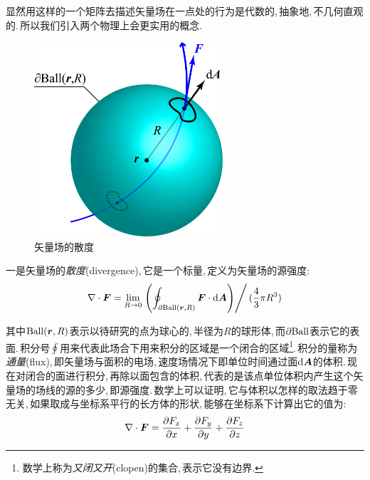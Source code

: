 显然用这样的一个矩阵去描述矢量场在一点处的行为是代数的,\,抽象地,\,不几何直观的.\,所以我们引入两个物理上会更实用的概念.

\begin{figure}
\centering
\includegraphics[width=7cm]{image/7-1-4.png}
\caption{矢量场的散度}
\end{figure}
一是矢量场的\emph{散度}(divergence),\,它是一个标量,\,定义为矢量场的源强度:
\[\nabla\cdot \boldsymbol{F}=\lim_{R\to 0}\left.\left(\oint_{\partial {\rm Ball}(\boldsymbol{r},R)}\boldsymbol{F}\cdot \textrm{d}\boldsymbol{A}\right)\right/(\frac{4}{3}\pi R^3)\]

其中\({\rm Ball}(\boldsymbol{r},R)\)表示以待研究的点为球心的,\,半径为\(R\)的球形体,\,而\(\partial {\rm Ball}\)表示它的表面.\,积分号\(\oint\)用来代表此场合下用来积分的区域是一个闭合的区域\footnote{数学上称为\emph{又闭又开}(clopen)的集合,\,表示它没有边界.}.\,积分的量称为\emph{通量}(flux),\,即矢量场与面积的电场,\,速度场情况下即单位时间通过面\(\textrm{d} \boldsymbol{A}\)的体积.\,现在对闭合的面进行积分,\,再除以面包含的体积,\,代表的是该点单位体积内产生这个矢量场的场线的源的多少,\,即源强度.\,数学上可以证明,\,它与体积以怎样的取法趋于零无关,\,如果取成与坐标系平行的长方体的形状,\,能够在坐标系下计算出它的值为:
\[\nabla\cdot\boldsymbol{F}=\frac{\partial F_x}{\partial x}+\frac{\partial F_y}{\partial y}+\frac{\partial F_z}{\partial z}\]

